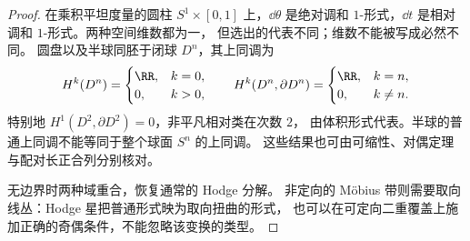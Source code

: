\begin{proof}
在乘积平坦度量的圆柱 $S^1\times[0,1]$ 上，$\dd\theta$ 是绝对调和
$1$-形式，$\dd t$ 是相对调和 $1$-形式。两种空间维数都为一，
但选出的代表不同；维数不能被写成必然不同。
圆盘以及半球同胚于闭球 $D^n$，其上同调为
\[
H^k(D^n)=
\begin{cases}\RR,&k=0,\\0,&k>0,\end{cases}
\qquad
H^k(D^n,\partial D^n)=
\begin{cases}\RR,&k=n,\\0,&k\ne n.\end{cases}
\]
特别地 $H^1(D^2,\partial D^2)=0$，非平凡相对类在次数 $2$，
由体积形式代表。半球的普通上同调不能等同于整个球面 $S^n$ 的上同调。
这些结果也可由可缩性、对偶定理与配对长正合列分别核对。

无边界时两种域重合，恢复通常的 Hodge 分解。
非定向的 Möbius 带则需要取向线丛：Hodge 星把普通形式映为取向扭曲的形式，
也可以在可定向二重覆盖上施加正确的奇偶条件，不能忽略该变换的类型。
\end{proof}
